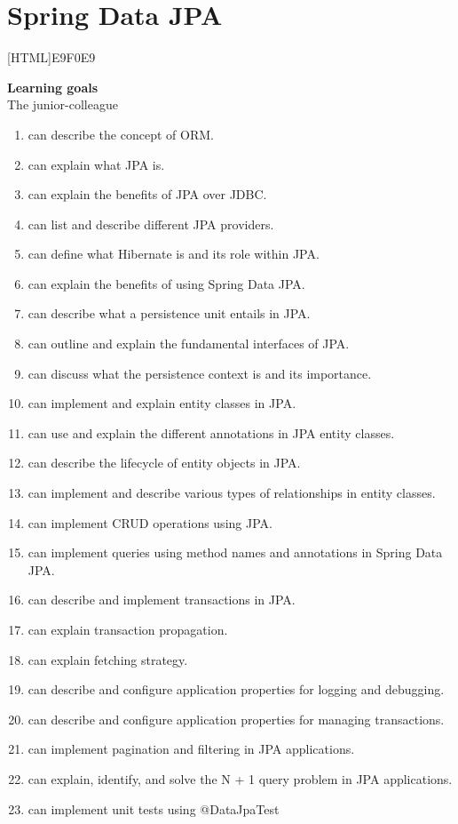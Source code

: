 \chapter{Spring Data JPA}

[HTML]{E9F0E9}{\parbox{\textwidth}{%
\noindent \textbf{Learning goals}\\
The junior-colleague
\begin{enumerate}[nolistsep]
\item can describe the concept of ORM.
\item can explain what JPA is.
\item can explain the benefits of JPA over JDBC.
\item can list and describe different JPA providers.
\item can define what Hibernate is and its role within JPA.
\item can explain the benefits of using Spring Data JPA.
\item can describe what a persistence unit entails in JPA.
\item can outline and explain the fundamental interfaces of JPA.
\item can discuss what the persistence context is and its importance.
\item can implement and explain entity classes in JPA.
\item can use and explain the different annotations in JPA entity classes.
\item can describe the lifecycle of entity objects in JPA.
\item can implement and describe various types of relationships in entity classes.
\item can implement CRUD operations using JPA.
\item can implement queries using method names and annotations in Spring Data JPA.
\item can describe and implement transactions in JPA.
\item can explain transaction propagation.
\item can explain fetching strategy.
\item can describe and configure application properties for logging and debugging.
\item can describe and configure application properties for managing transactions.
\item can implement pagination and filtering in JPA applications.
\item can explain, identify, and solve the N + 1 query problem in JPA applications.
\item can implement unit tests using @DataJpaTest
\end{enumerate}}}

